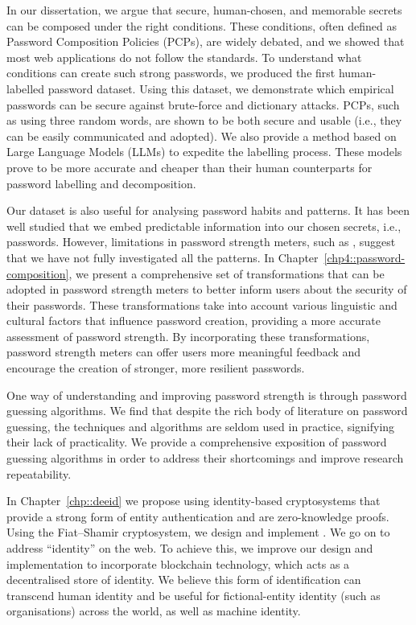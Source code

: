 In our dissertation, we argue that secure, human-chosen, and memorable secrets can be composed under the right conditions. These conditions, often defined as Password Composition Policies (PCPs), are widely debated, and we showed that most web applications do not follow the standards. To understand what conditions can create such strong passwords, we produced the first human-labelled password dataset. Using this dataset, we demonstrate which empirical passwords can be secure against brute-force and dictionary attacks. PCPs, such as using three random words, are shown to be both secure and usable (i.e., they can be easily communicated and adopted). We also provide a method based on Large Language Models (LLMs) to expedite the labelling process. These models prove to be more accurate and cheaper than their human counterparts for password labelling and decomposition.

Our dataset is also useful for analysing password habits and patterns. It has been well studied that we embed predictable information into our chosen secrets, i.e., passwords. However, limitations in password strength meters, such as \zxcvbn, suggest that we have not fully investigated all the patterns. In Chapter~\ref{chp4::password-composition}, we present a comprehensive set of transformations that can be adopted in password strength meters to better inform users about the security of their passwords. These transformations take into account various linguistic and cultural factors that influence password creation, providing a more accurate assessment of password strength. By incorporating these transformations, password strength meters can offer users more meaningful feedback and encourage the creation of stronger, more resilient passwords.

One way of understanding and improving password strength is through password guessing algorithms. We find that despite the rich body of literature on password guessing, the techniques and algorithms are seldom used in practice, signifying their lack of practicality. We provide a comprehensive exposition of password guessing algorithms in order to address their shortcomings and improve research repeatability.

In Chapter~\ref{chp::deeid} we propose using identity-based cryptosystems that provide a strong form of entity authentication and are zero-knowledge proofs. Using the Fiat--Shamir cryptosystem, we design and implement \deeid. We go on to address ``identity'' on the web. To achieve this, we improve our design and implementation to incorporate blockchain technology, which acts as a decentralised store of identity. We believe this form of identification can transcend human identity and be useful for fictional-entity identity (such as organisations) across the world, as well as machine identity.

